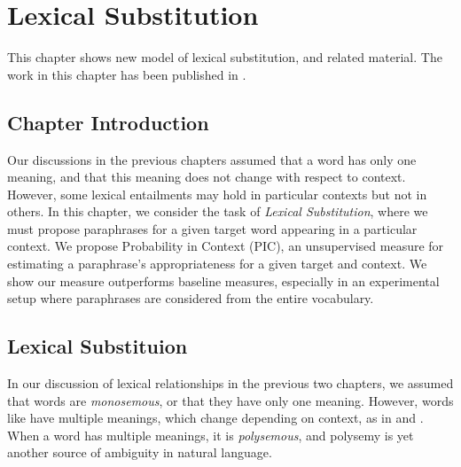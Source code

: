 \chapter{Lexical Substitution}
\label{ch:lexsub}

This chapter shows new model of lexical substitution, and related
material. The work in this chapter has been published in
.

\section{Chapter Introduction}


Our discussions in the previous chapters assumed that a word has only one
meaning, and that this meaning does not change with respect to context.
However, some lexical entailments may hold in particular contexts but not
in others. In this chapter, we consider the task of {\em Lexical Substitution},
where we must propose paraphrases for a given target word appearing in
a particular context. We propose Probability in Context (PIC), an unsupervised
measure for estimating a paraphrase's appropriateness for a given target and
context. We show our measure outperforms baseline measures, especially in an
experimental setup where paraphrases are considered from the entire vocabulary.

\section{Lexical Substituion}

In our discussion of lexical relationships in the previous two chapters, we
assumed that words are {\em monosemous}, or that they have only one meaning.
However, words like  have multiple meanings, which change depending
on context, as in  and . When a word has
multiple meanings, it is {\em polysemous}, and polysemy is yet another source
of ambiguity in natural language.

